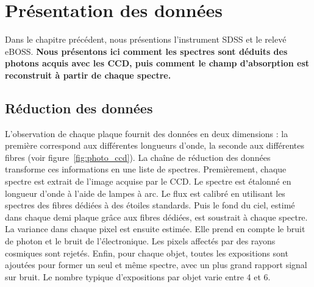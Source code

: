\documentclass[11pt, twoside, a4paper, openright]{report}
\begin{document}

\graphicspath{ {../figures/donnees/} }

\chapter{Présentation des données}
\minitoc
\newpage
\thispagestyle{fancy}

Dans le chapitre précédent, nous présentions l'instrument SDSS et le relevé eBOSS.
\textbf{Nous présentons ici comment les spectres sont déduits des photons acquis avec les CCD, puis comment le champ d'absorption est reconstruit à partir de chaque spectre.}

\section{Réduction des données}
L'observation de chaque plaque fournit des données en deux dimensions : la première correspond aux différentes longueurs d'onde, la seconde aux différentes fibres (voir figure~\ref{fig:photo_ccd}). La chaîne de réduction des données transforme ces informations en une liste de spectres.
Premièrement, chaque spectre est extrait de l'image acquise par le CCD. Le spectre est étalonné en longueur d'onde à l'aide de lampes à arc. Le flux est calibré en utilisant les spectres des fibres dédiées à des étoiles standards.
Puis le fond du ciel, estimé dans chaque demi plaque grâce aux fibres dédiées, est soustrait à chaque spectre.
La variance dans chaque pixel est ensuite estimée. Elle prend en compte le bruit de photon et le bruit de l'électronique. Les pixels affectés par des rayons cosmiques sont rejetés.
Enfin, pour chaque objet, toutes les expositions sont ajoutées pour former un seul et même spectre, avec un plus grand rapport signal sur bruit. Le nombre typique d'expositions par objet varie entre 4 et 6.
\end{document}
